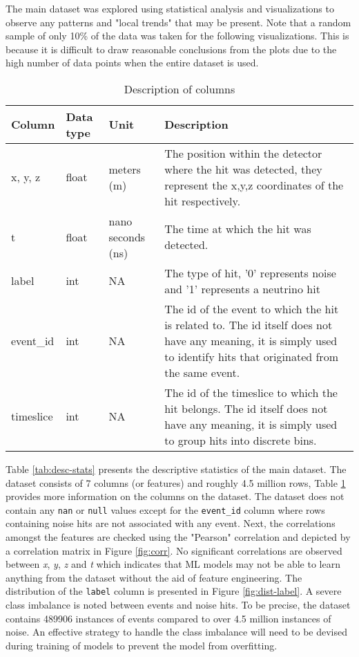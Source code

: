 The main dataset was explored using statistical analysis and
visualizations to observe any patterns and "local trends" that may be
present. Note that a random sample of only 10\% of the data was taken
for the following visualizations. This is because it is difficult to
draw reasonable conclusions from the plots due to the high number of
data points when the entire dataset is used.

\begin{table}[h]
  \centering
  \caption{Description of columns}
  \label{tab:desc-cols}
  \begin{tabular}{p{1.5cm}p{1.5cm}p{2cm}p{8cm}}
    \hline
    Column & Data type & Unit & Description \\
    \hline
    x, y, z & float & meters (m) & The position within the detector
    where the hit was detected, they represent the x,y,z coordinates
    of the hit respectively. \\
    t & float & nano seconds (ns) & The time at which the hit was
    detected. \\
    label & int & NA & The type of hit, '0' represents noise and '1'
    represents a neutrino hit \\
    event\_id & int & NA & The id of the event to which the hit is
    related to. The id itself does not have any meaning, it is simply
    used to identify hits that originated from the same event. \\
    timeslice & int & NA & The id of the timeslice to which the hit
    belongs. The id itself does not have any meaning, it is simply
    used to group hits into discrete bins. \\
    \hline
  \end{tabular}
\end{table}

Table \ref{tab:desc-stats} presents the descriptive statistics of the
main dataset. The dataset consists of 7 columns (or features) and
roughly 4.5 million rows, Table \ref{tab:desc-cols} provides more
information on the columns on the dataset. The dataset does not
contain any \texttt{nan} or \texttt{null} values except for the
\texttt{event\_id} column where rows containing noise hits are not
associated with any event. Next, the correlations amongst the features
are checked using the "Pearson" correlation and depicted by a
correlation matrix in Figure \ref{fig:corr}. No significant
correlations are observed between \emph{x}, \emph{y}, \emph{z} and
\emph{t} which indicates that ML models may not be able to learn
anything from the dataset without the aid of feature engineering. The
distribution of the \texttt{label} column is presented in Figure
\ref{fig:dist-label}. A severe class imbalance is noted between events
and noise hits. To be precise, the dataset contains 489906 instances
of events compared to over 4.5 million instances of noise. An
effective strategy to handle the class imbalance will need to be
devised during training of models to prevent the model from
overfitting.

